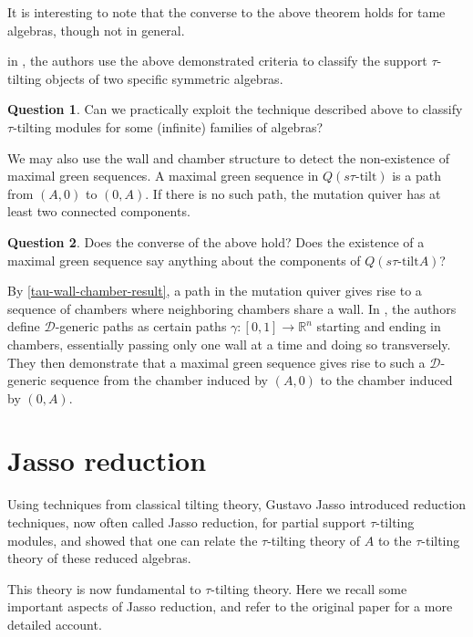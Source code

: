 \documentclass[]{article}
\theoremstyle{definition}
\newtheorem{question}{Question}
\newcommand{\tu}{\ensuremath{\tau}}
\begin{document}
It is interesting to note that the converse to the above theorem holds for tame algebras, though not in general\cite{keller2020tame}.

in \cite{dij17}, the authors use the above demonstrated criteria to classify the support \tu-tilting objects of two specific symmetric algebras. 

\begin{question}
	Can we practically exploit the technique described above to classify \tu-tilting modules for some (infinite) families of algebras?
	\end{question}

We may also use the wall and chamber structure to detect the non-existence of maximal green sequences. A maximal green sequence in $Q(s\tu\text{-tilt})$ is a path from $(A,0)$ to $(0,A)$. If there is no such path, the mutation quiver has at least two connected components.

\begin{question}
	Does the converse of the above hold? Does the existence of a maximal green sequence say anything about the components of $Q(s\tu\text{-tilt} A)$?
\end{question}

By \cref{tau-wall-chamber-result}, a path in the mutation quiver gives rise to a sequence of chambers where neighboring chambers share a wall. In \cite{Br_stle_2019}, the authors define $\mathcal{D}$-generic paths as certain paths $\gamma:[0,1] \to \mathbb{R}^n$ starting and ending in chambers, essentially passing only one wall at a time and doing so transversely. They then demonstrate that a maximal green sequence gives rise to such a $\mathcal{D}$-generic sequence from the chamber induced by $(A,0)$ to the chamber induced by $(0,A)$.



\section{Jasso reduction}
Using techniques from classical tilting theory, Gustavo Jasso\cite{jassoreduction} introduced reduction techniques, now often called Jasso reduction, for partial support \tu-tilting modules, and showed that one can relate the \tu-tilting theory of $A$ to the \tu-tilting theory of these reduced algebras.

This theory is now fundamental to \tu-tilting theory. Here we recall some important aspects of Jasso reduction, and refer to the original paper for a more detailed account.
\end{document}
